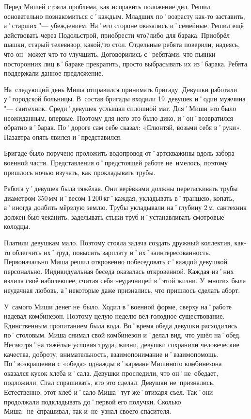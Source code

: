 Перед Мишей стояла проблема, как исправить положение дел. Решил основательно познакомиться с˚каждым. Младших по˚возрасту как-то заставить, а˚старших "--- убеждением. На˚его стороне оказались и˚семейные. Решил ещё действовать через Подольстрой, приобрести что\=/либо для барака. Приобрёл шашки, старый телевизор, какой\=/то стол. Отдельные ребята поверили, надеясь, что он˚может что-то улучшить. Договорились с˚ребятами, что пьянки посторонних лиц в˚бараке  прекратить, просто выбрасывать их из˚барака. Ребята поддержали данное предложение. 

На~следующий день Миша отправился принимать бригаду. Девушки работали у˚городской больницы. В~состав бригады входили 19~девушек и˚один мужчина "--- сантехник. Среди˚девушек услышал сплошной мат. Для˚Миши это было неожиданным, впервые. Поэтому для него это было дико, и˚он˚возвратился обратно в˚барак. По˚дороге сам себе сказал: «Слюнтяй, возьми себя в˚руки». Назавтра опять явился и˚представился.

Бригаде было поручено проложить водопровод от˚артскважины вдоль забора военной части. Представления о˚предстоящей работе не~имелось, поэтому пришлось ночью изучать, как прокладывать трубы.

Работа у˚девушек была тяжёлая. Они верёвками должны перетаскивать трубы диаметром 350\,мм и˚весом 1\,200\,кг˚каждая, укладывать в˚траншею, копать, а˚иногда долбить мёрзлую землю. Трубы укладывали на˚глубину 2\,м, сантехник должен был чеканить, заделывать стыки труб и˚устанавливать смотровые колодцы.

Платили девушкам мало. Поэтому стояла задача создать дружный коллектив, как-то облегчить их˚труд, повысить зарплату и˚их˚заинтересованность. Первоначально Миша решил откровенно побеседовать с˚каждой девушкой персонально. Индивидуальная беседа оказалась откровенной. Каждая из˚них излила своё наболевшее, считая себя неудачницей в˚этой жизни. У~многих была неудачная любовь, а˚некоторые даже признались, что пришлось сделать аборт.

У~самого Миши денег не~было. Ходил в˚военной форме, сверху на˚работе надевал комбинезон. Поэтому целую неделю вёл голодное существование. Единственным пропитанием была вода. Во˚время обеда девушки расходились по˚столовым. Миша снимал свой комбинезон и˚делал вид, что ушёл на˚обед. Несмотря˚на тяжёлые условия труда, жизни, девушки сохранили человеческие качества, доброту, внимательность, взаимопонимание и˚взаимопомощь. По˚возвращении с «обеда» однажды в˚кармане Мишиного комбинезона оказался кусок хлеба и˚сала. Девушки проследили, что он˚не~обедает, подложили. Стал спрашивать, кто это сделал. Девушки не~признались. Естественно, этот хлеб и˚сало Миша˚тут же˚втихаря съел. Так˚они продолжали подкладывать до˚первой его получки. Сколько Миша˚не~спрашивал, так и~не~узнал своего спасителя.

